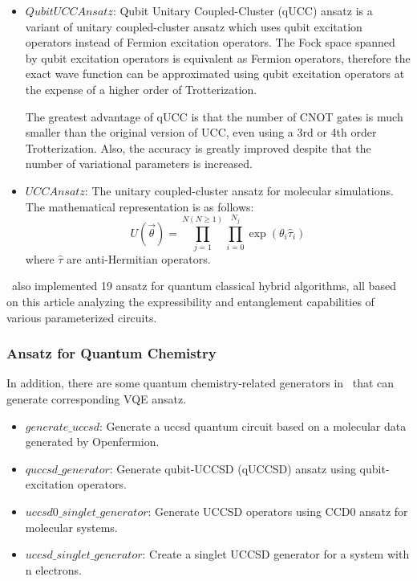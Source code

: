 \begin{itemize}
    \item $QubitUCCAnsatz$: Qubit Unitary Coupled-Cluster (qUCC) ansatz is a variant of unitary coupled-cluster ansatz which uses qubit excitation operators instead of Fermion excitation operators. The Fock space spanned by qubit excitation operators is equivalent as Fermion operators, therefore the exact wave function can be approximated using qubit excitation operators at the expense of a higher order of Trotterization.

    The greatest advantage of qUCC is that the number of CNOT gates is much smaller than the original version of UCC, even using a 3rd or 4th order Trotterization. Also, the accuracy is greatly improved despite that the number of variational parameters is increased.

    \item $UCCAnsatz$: The unitary coupled-cluster ansatz for molecular simulations. The mathematical representation is as follows:
    $$U(\vec{\theta}) = \prod_{j=1}^{N(N\ge1)}{\prod_{i=0}^{N_{j}}{\exp{(\theta_{i}\hat{\tau}_{i})}}}$$
    where $\hat{\tau}$ are anti-Hermitian operators.
\end{itemize}

\MindQuantum \ also implemented 19 ansatz for quantum classical hybrid algorithms, all based on this article analyzing the expressibility and entanglement capabilities of various parameterized circuits.\cite{Sim_2019}

\subsubsection{Ansatz for Quantum Chemistry}

In addition, there are some quantum chemistry-related generators in \MindQuantum \ that can generate corresponding VQE ansatz.

\begin{itemize}
    \item $generate\_uccsd$: Generate a uccsd quantum circuit based on a molecular data generated by Openfermion.
    \item $quccsd\_generator$: Generate qubit-UCCSD (qUCCSD) ansatz using qubit-excitation operators.
    \item $uccsd0\_singlet\_generator$: Generate UCCSD operators using CCD0 ansatz for molecular systems.
    \item $uccsd\_singlet\_generator$: Create a singlet UCCSD generator for a system with n electrons.
\end{itemize}

